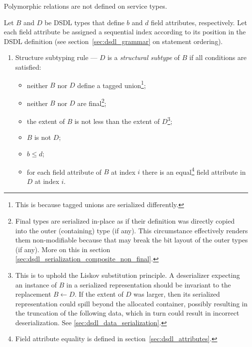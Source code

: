 Polymorphic relations are not defined on service types.

Let $B$ and $D$ be DSDL types that define $b$ and $d$ field attributes, respectively.
Let each field attribute be assigned a sequential index according to its position in the DSDL definition
(see section~\ref{sec:dsdl_grammar} on statement ordering).

\begin{enumerate}
    \item Structure subtyping rule --- $D$ is a \emph{structural subtype} of $B$ if all conditions are satisfied:
    \begin{itemize}
        \item neither $B$ nor $D$ define a tagged union\footnote{%
            This is because tagged unions are serialized differently.
        };
        \item neither $B$ nor $D$ are final\footnote{%
            Final types are serialized in-place as if their definition was directly copied into the outer
            (containing) type (if any).
            This circumstance effectively renders them non-modifiable because that may break the bit layout
            of the outer types (if any).
            More on this in section \ref{sec:dsdl_serialization_composite_non_final}.
        };
        \item the extent of $B$ is not less than the extent of $D$\footnote{%
            This is to uphold the Liskov substitution principle.
            A deserializer expecting an instance of $B$ in a serialized representation should be invariant
            to the replacement $B \leftarrow{} D$.
            If the extent of $D$ was larger, then its serialized representation could spill beyond the allocated
            container, possibly resulting in the truncation of the following data, which in turn could result in
            incorrect deserialization.
            See \ref{sec:dsdl_data_serialization}.
        };
        \item $B$ is not $D$;
        \item $b \leq d$;
        \item for each field attribute of $B$ at index $i$ there is an equal\footnote{%
            Field attribute equality is defined in section~\ref{sec:dsdl_attributes}.
        } field attribute in $D$ at index $i$.
    \end{itemize}


\end{enumerate}

